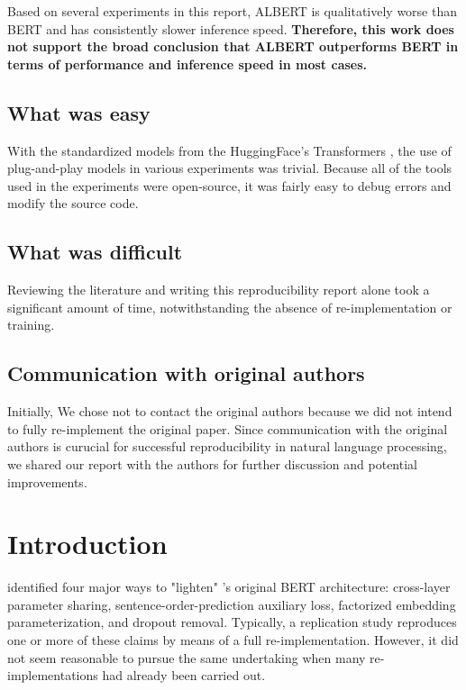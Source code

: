 \documentclass{article}
\begin{document}
Based on several experiments in this report, ALBERT is qualitatively worse than BERT and has consistently slower inference speed. \textbf{Therefore, this work does not support the broad conclusion that ALBERT outperforms BERT in terms of performance and inference speed in most cases.}

\subsection*{What was easy}

With the standardized models from the HuggingFace's Transformers \cite{Wolf2019HuggingFacesTS}, the use of plug-and-play models in various experiments was trivial. Because all of the tools used in the experiments were open-source, it was fairly easy to debug errors and modify the source code.

\subsection*{What was difficult}

Reviewing the literature and writing this reproducibility report alone took a significant amount of time, notwithstanding the absence of re-implementation or training.

\subsection*{Communication with original authors}

Initially, We chose not to contact the original authors because we did not intend to fully re-implement the original paper. Since communication with the original authors is curucial for successful reproducibility in natural language processing, we shared our report with the authors for further discussion and potential improvements.

\newpage

\section{Introduction}

\citet{Lan2020ALBERT} identified four major ways to "lighten" \citet{devlin-etal-2019-bert}'s original BERT architecture: cross-layer parameter sharing, sentence-order-prediction auxiliary loss, factorized embedding parameterization, and dropout removal. Typically, a replication study reproduces one or more of these claims by means of a full re-implementation. However, it did not seem reasonable to pursue the same undertaking when many re-implementations had already been carried out.
\end{document}
